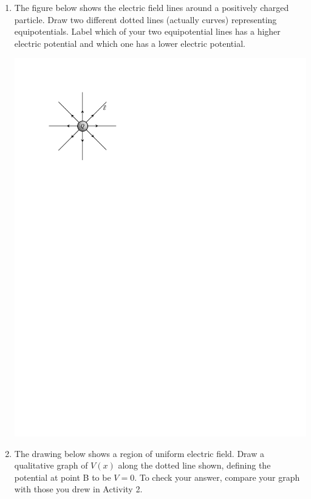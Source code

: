 \begin{enumerate}[labparts]
\item The figure below shows the electric field lines around a positively charged particle.  Draw two different dotted lines (actually curves) representing equipotentials.  Label which of your two equipotential lines has a higher electric potential and which one has a lower electric potential. 
\begin{center}
\vspace{-0.1 in}
\includegraphics{potential_intro/activity_5_figs/point_charge_E_field.pdf}
\end{center}

\item The drawing below shows a region of uniform electric field.  Draw a qualitative graph of $V(x)$ along the dotted line shown, defining the potential at point B to be $V=0$.  To check your answer, compare your graph with those you drew in Activity 2.  \label{part_potential_intro_draw_V} 


\end{enumerate}

